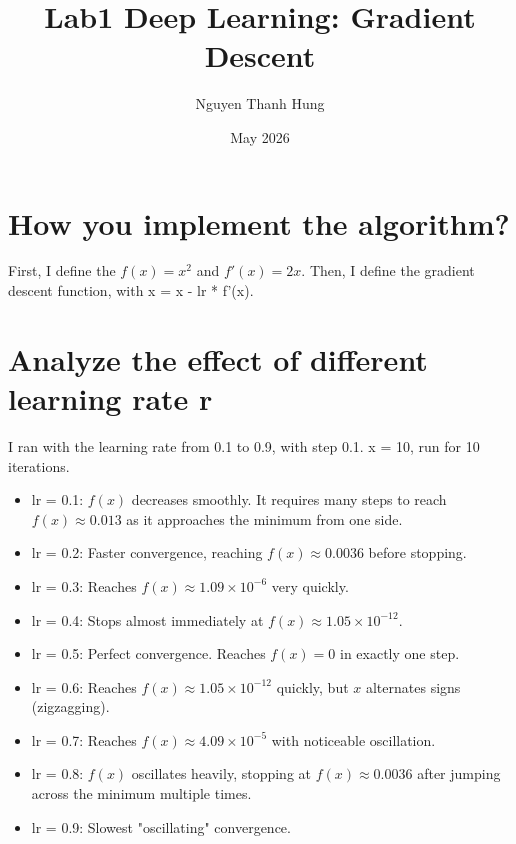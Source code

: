 \documentclass{article}
\title{Lab1 Deep Learning: Gradient Descent}
\author{Nguyen Thanh Hung}
\date{May 2026}
\begin{document}
\maketitle

\section{How you implement the algorithm?}

First, I define the $f(x) = x^2$ and $f'(x) = 2x$. 
Then, I define the gradient descent function, with x = x - lr * f'(x). 

\section{Analyze the effect of different learning rate r}

I ran with the learning rate from 0.1 to 0.9, with step 0.1. x = 10, run for 10 iterations. 

\begin{itemize}
    \item lr = 0.1: $f(x)$ decreases smoothly. It requires many steps to reach $f(x) \approx 0.013$ as it approaches the minimum from one side.
    \item lr = 0.2: Faster convergence, reaching $f(x) \approx 0.0036$ before stopping.
    \item lr = 0.3: Reaches $f(x) \approx 1.09 \times 10^{-6}$ very quickly.
    \item lr = 0.4: Stops almost immediately at $f(x) \approx 1.05 \times 10^{-12}$.
    \item lr = 0.5: Perfect convergence. Reaches $f(x) = 0$ in exactly one step.
    \item lr = 0.6: Reaches $f(x) \approx 1.05 \times 10^{-12}$ quickly, but $x$ alternates signs (zigzagging).
    \item lr = 0.7: Reaches $f(x) \approx 4.09 \times 10^{-5}$ with noticeable oscillation.
    \item lr = 0.8: $f(x)$ oscillates heavily, stopping at $f(x) \approx 0.0036$ after jumping across the minimum multiple times.
    \item lr = 0.9: Slowest "oscillating" convergence. 
\end{itemize}
\end{document}
